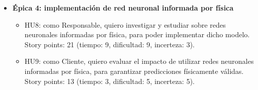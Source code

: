 \documentclass[
11pt, %
]{charter}
\begin{document}
\begin{itemize}
\begin{itemize}
      \item HU7: como Cliente, quiero obtener figuras de mérito de los perfiles de potencia y combinación de otras variables, para mejorar la propuesta de estrategias de recambio de combustibles. Story points: 13 (tiempo: 3, dificultad: 7, incerteza: 3).
    \end{itemize}
  \item \textbf{Épica 4: implementación de red neuronal informada por física}
    \begin{itemize}
      \item HU8: como Responsable, quiero investigar y estudiar sobre redes neuronales informadas por física, para poder implementar dicho modelo. Story points: 21 (tiempo: 9, dificultad: 9, incerteza: 3).
      \item HU9: como Cliente, quiero evaluar el impacto de utilizar redes neuronales informadas por física, para garantizar predicciones físicamente válidas. Story points: 13 (tiempo: 3, dificultad: 5, incerteza: 5).
    \end{itemize}
\end{itemize}


    
\end{document}
